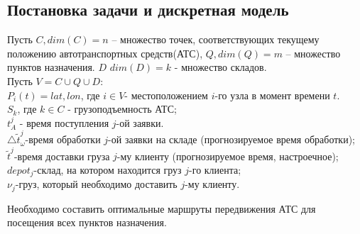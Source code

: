 \documentclass[]{TAACpaper}
\begin{document}
\subsection{Постановка задачи и дискретная модель}
Пусть $C,dim(C)=n$ – множество точек, соответствующих текущему положению автотранспортных средств(АТС), $Q,dim(Q)=m$ – множество пунктов назначения. $D$ $dim(D)=k$ - множество складов.\\
Пусть $V=C\cup{Q}\cup{D}$:\\
$P_i(t)={lat,lon}$, где $i\in{V}$- местоположением $i$-го узла в момент времени $t$.\\
$S_k$, где $k\in{C}$ - грузоподъемность АТС;\\
$t_{A}^{j}$ - время поступления $j$-ой заявки.\\
$\bigtriangleup\tilde{t}_{\omega}^{j}$-время обработки $j$-ой заявки на складе (прогнозируемое время обработки);\\
$\tilde{t}^{j}$-время доставки груза $j$-му клиенту (прогнозируемое время, настроечное);\\
$depot_j$-склад, на котором находится груз $j$-го клиента;\\
$\nu_j$-груз, который необходимо доставить $j$-му клиенту.

Необходимо составить оптимальные маршруты передвижения АТС для посещения всех пунктов назначения.
\end{document}
